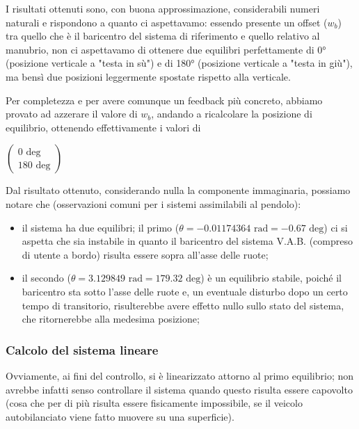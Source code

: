 I risultati ottenuti sono, con buona approssimazione, considerabili numeri naturali e rispondono a quanto ci aspettavamo: essendo presente un offset ($w_b$) tra quello che è il baricentro del sistema di riferimento e quello relativo al manubrio, non ci aspettavamo di ottenere due equilibri perfettamente di 0° (posizione verticale a "testa in sù") e di 180° (posizione verticale a "testa in giù"), ma bensì due posizioni leggermente spostate rispetto alla verticale.

Per completezza e per avere comunque un feedback più concreto, abbiamo provato ad azzerare il valore di $w_b$, andando a ricalcolare la posizione di equilibrio, ottenendo effettivamente i valori di
\begin{center}
	$\left(\begin{array}{c}
	0 \text{ deg}\\
	180 \text{ deg}
	\end{array}\right)$
\end{center}

Dal risultato ottenuto, considerando nulla la componente immaginaria, possiamo notare che (osservazioni comuni per i sistemi assimilabili al pendolo):

\begin{itemize}
	\item il sistema ha due equilibri; il primo ($\theta = -0.01174364 \text{ rad} = -0.67 \text{ deg}$) ci si aspetta che sia instabile in quanto il baricentro del sistema V.A.B. (compreso di utente a bordo) risulta essere sopra all'asse delle ruote;
	\item il secondo ($\theta = 3.129849 \text{ rad} = 179.32 \text{ deg}$) è un equilibrio stabile, poiché il baricentro sta sotto l'asse delle ruote e, un eventuale disturbo dopo un certo tempo di transitorio, risulterebbe avere effetto nullo sullo stato del sistema, che ritornerebbe alla medesima posizione;
\end{itemize}

\subsubsection{Calcolo del sistema lineare}
Ovviamente, ai fini del controllo, si è linearizzato attorno al primo equilibrio; non avrebbe infatti senso controllare il sistema quando questo risulta essere capovolto (cosa che per di più risulta essere fisicamente impossibile, se il veicolo autobilanciato viene fatto muovere su una superficie).

